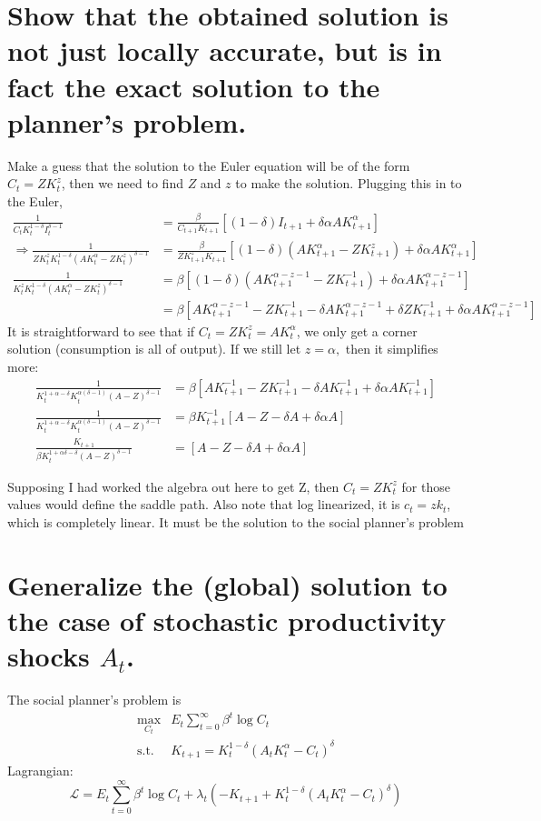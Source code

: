 \documentclass[12pt,oneside,reqno]{amsart}
\newcommand{\sumti}{\sum\limits_{t=0}^\infty} %
\begin{document}
\section{Show that the obtained solution is not just locally accurate, but is in fact the exact solution to the planner’s problem.}
Make a guess that the solution to the Euler equation will be of the form $C_t= ZK_t^z$, then we need to find $Z$ and $z$ to make the solution. Plugging this in to the Euler, 
\begin{align*}
\frac{1}{C_tK_t^{1-\delta}I_t^{\delta-1}}
& = \frac{\beta}{C_{t+1}K_{t+1}}
\left[ (1-\delta)I_{t+1}+\delta\alpha A K_{t+1}^\alpha \right] 
\\
\Rightarrow \frac{1}{ZK_t^zK_t^{1-\delta}(AK_t^\alpha -ZK_t^z)^{\delta-1}}
& = \frac{\beta}{ZK_{t+1}^zK_{t+1}}
\left[ (1-\delta)(AK_{t+1}^\alpha-ZK_{t+1}^z)+\delta\alpha A K_{t+1}^\alpha \right] 
\\
\frac{1}{K_t^zK_t^{1-\delta}(AK_t^\alpha -ZK_t^z)^{\delta-1}}
& = \beta \left[ (1-\delta)(AK_{t+1}^{\alpha-z-1}-ZK_{t+1}^{-1})+\delta\alpha A K_{t+1}^{\alpha-z-1} \right] 
\\
& = \beta[ AK_{t+1}^{\alpha-z-1}-ZK_{t+1}^{-1} 
    - \delta AK_{t+1}^{\alpha-z-1}+\delta ZK_{t+1}^{-1}
    +\delta\alpha A K_{t+1}^{\alpha-z-1} ]
\end{align*}
It is straightforward to see that if $C_t=ZK_t^z = AK_t^\alpha$, we only get a corner solution (consumption is all of output). If we still let $z=\alpha,$ then it simplifies more:
\begin{align*}
\frac{1}{K_t^{1+\alpha-\delta} K_t^{\alpha(\delta-1)}(A-Z)^{\delta-1}} 
& = \beta[ AK_{t+1}^{-1}-ZK_{t+1}^{-1}-\delta AK_{t+1}^{-1} +\delta\alpha AK_{t+1}^{-1}]
\\
\frac{1}{K_t^{1+\alpha-\delta} K_t^{\alpha(\delta-1)}(A-Z)^{\delta-1}} 
& = \beta K_{t+1}^{-1}[ A-Z-\delta A +\delta\alpha A]
\\
\frac{K_{t+1}}{\beta K_t^{1+\alpha\delta-\delta} (A-Z)^{\delta-1} }
& =[ A-Z-\delta A +\delta\alpha A]
\end{align*}

Supposing I had worked the algebra out here to get Z, then $C_t=ZK_t^z$ for those values would define the saddle path. Also note that log linearized, it is $c_t = zk_t$, which is completely linear. It must be the solution to the social planner's problem 

\section{Generalize the (global) solution to the case of stochastic productivity shocks $A_t$.}
The social planner's problem is 
\begin{align*}
\max_{C_t} & E_t\sumti \beta^t \log C_t \\
\text{s.t. }& K_{t+1} = K_t^{1-\delta}(A_tK_t^\alpha -C_t)^\delta
\end{align*}
Lagrangian:
\[ \mathcal{L} = E_t\sumti \beta^t \log C_t +\lambda_t(-K_{t+1} + K_t^{1-\delta}(A_tK_t^\alpha -C_t)^\delta) \]
\end{document}
